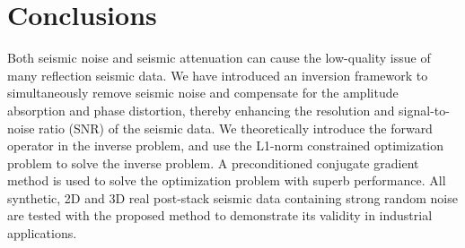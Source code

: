 \section{Conclusions}
Both seismic noise and seismic attenuation can cause the low-quality issue of many reflection seismic data. We have introduced an inversion framework to simultaneously remove seismic noise and compensate for the amplitude absorption and phase distortion, thereby enhancing the resolution and signal-to-noise ratio (SNR) of the seismic data. We theoretically introduce the forward operator in the inverse problem, and use the L1-norm constrained optimization problem to solve the inverse problem. A preconditioned conjugate gradient method is used to solve the optimization problem with superb performance.  All synthetic, 2D and 3D real post-stack seismic data containing strong random noise are tested with the proposed method to demonstrate its validity in industrial applications.


%









